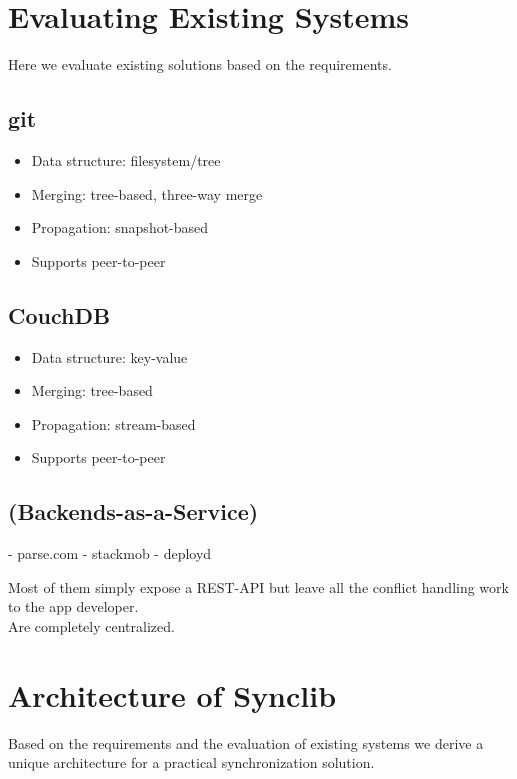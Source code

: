 \section{Evaluating Existing Systems}
Here we evaluate existing solutions based on the requirements.

\subsection{git}

\begin{itemize}
\item
  Data structure: filesystem/tree
\item
  Merging: tree-based, three-way merge
\item
  Propagation: snapshot-based
\item
  Supports peer-to-peer
\end{itemize}

\subsection{CouchDB}

\begin{itemize}
\item
  Data structure: key-value
\item
  Merging: tree-based
\item
  Propagation: stream-based
\item
  Supports peer-to-peer
\end{itemize}

\subsection{(Backends-as-a-Service)}
- parse.com
- stackmob
- deployd

Most of them simply expose a REST-API but leave all the conflict handling work to the app developer.\\
Are completely centralized.

\section{Architecture of Synclib}
Based on the requirements and the evaluation of existing systems we derive a unique architecture for a practical synchronization solution.

